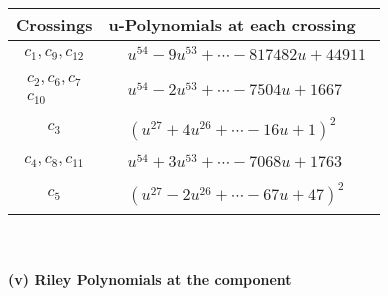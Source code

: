 \documentclass[1p]{elsarticle_modified}
\theoremstyle{definition}
\begin{document}
\begin{tabular}{m{50pt}|m{274pt}}
Crossings & \hspace{64pt}u-Polynomials at each crossing \\
\hline $$\begin{aligned}c_{1},c_{9},c_{12}\end{aligned}$$&$\begin{aligned}
&u^{54}-9 u^{53}+\cdots-817482 u+44911
\end{aligned}$\\
\hline $$\begin{aligned}c_{2},c_{6},c_{7}\\c_{10}\end{aligned}$$&$\begin{aligned}
&u^{54}-2 u^{53}+\cdots-7504 u+1667
\end{aligned}$\\
\hline $$\begin{aligned}c_{3}\end{aligned}$$&$\begin{aligned}
&(u^{27}+4 u^{26}+\cdots-16 u+1)^{2}
\end{aligned}$\\
\hline $$\begin{aligned}c_{4},c_{8},c_{11}\end{aligned}$$&$\begin{aligned}
&u^{54}+3 u^{53}+\cdots-7068 u+1763
\end{aligned}$\\
\hline $$\begin{aligned}c_{5}\end{aligned}$$&$\begin{aligned}
&(u^{27}-2 u^{26}+\cdots-67 u+47)^{2}
\end{aligned}$\\
\hline
\end{tabular}\\~\\
\newpage\renewcommand{\arraystretch}{1}
\flushleft \textbf{(v) Riley Polynomials at the component}\newline \\
\end{document}
